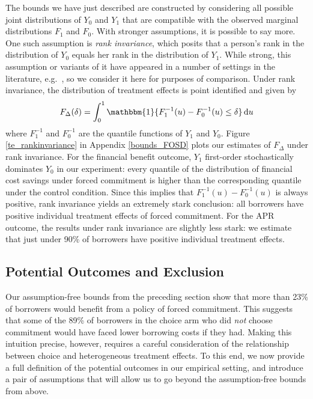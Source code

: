 \documentclass[ecta,nameyear,final]{econsocart}
\begin{document}
The bounds we have just described are constructed by considering all possible joint distributions of $Y_0$ and $Y_1$ that are compatible with the observed marginal distributions $F_1$ and $F_0$. 
With stronger assumptions, it is possible to say more.
One such assumption is \emph{rank invariance}, which posits that a person's rank in the distribution of $Y_0$ equals her rank in the distribution of $Y_1$.
While strong, this assumption or variants of it have appeared in a number of settings in the literature, e.g.\ \cite{chernozhukov2005iv}, so we consider it here for purposes of comparison.
Under rank invariance, the distribution of treatment effects is point identified and given by 
\[
F_\Delta(\delta) = \int_0^1 \mathbbm{1}\{ F_1^{-1}(u) - F_0^{-1}(u)\leq \delta\}\,\mathrm{d}u 
\]
where $F_1^{-1}$ and $F_0^{-1}$ are the quantile functions of $Y_1$ and $Y_0$. Figure \ref{te_rankinvariance} in Appendix \ref{bounds_FOSD} plots our estimates of $F_\Delta$ under rank invariance.
For the financial benefit outcome, $Y_1$ first-order stochastically dominates $Y_0$ in our experiment: every quantile of the distribution of financial cost savings under forced commitment is higher than the corresponding quantile under the control condition. Since this implies that $F^{-1}_1(u) - F^{-1}_0(u)$ is always positive, rank invariance yields an extremely stark conclusion: all borrowers have positive individual treatment effects of forced commitment. 
For the APR outcome, the results under rank invariance are slightly less stark: we estimate that just under 90\% of borrowers have positive individual treatment effects. 

\subsection{Potential Outcomes and Exclusion}
\label{sec:potentialOutcomes}

Our assumption-free bounds from the preceding section show that more than 23\% of borrowers would benefit from a policy of forced commitment. 
This suggests that some of the 89\% of borrowers in the choice arm who did \emph{not} choose commitment would have faced lower borrowing costs if they had.
Making this intuition precise, however, requires a careful consideration of the relationship between choice and heterogeneous treatment effects. 
To this end, we now provide a full definition of the potential outcomes in our empirical setting, and introduce a pair of assumptions that will allow us to go beyond the assumption-free bounds from above.
\end{document}
